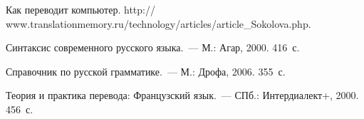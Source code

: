 \begin{multicols}{2}
{{\begin{thebibliography}{99}
     Как переводит компьютер. {\sf 
http:// www.translationmemory.ru/technology/articles/article\_\linebreak Sokolova.php}.
     
     Синтаксис современного русского языка.~--- М.: Агар, 2000.  416~с.
     
     Справочник по русской грамматике.~--- М.: Дрофа, 2006.  355~с.
     
     \label{end\stat}
     
     Теория и практика перевода: Французский язык.~--- СПб.: 
Интердиалект+, 2000. 456~с.
 \end{thebibliography}
}
}


\end{multicols}       